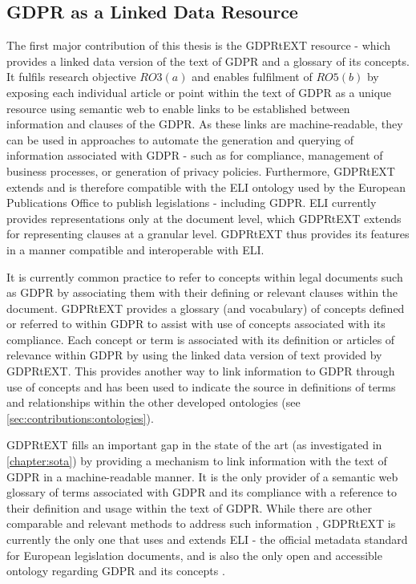 \subsection{GDPR as a Linked Data Resource}
The first major contribution of this thesis is the GDPRtEXT resource - which provides a linked data version of the text of GDPR and a glossary of its concepts. It fulfils research objective $RO3(a)$ and enables fulfilment of $RO5(b)$ by exposing each individual article or point within the text of GDPR as a unique resource using semantic web to enable links to be established between information and clauses of the GDPR. As these links are machine-readable, they can be used in approaches to automate the generation and querying of information associated with GDPR - such as for compliance, management of business processes, or generation of privacy policies. Furthermore, GDPRtEXT extends and is therefore compatible with the ELI ontology \cite{thomas_european_2019} used by the European Publications Office to publish legislations - including GDPR. ELI currently provides representations only at the document level, which  GDPRtEXT extends for representing clauses at a granular level. GDPRtEXT thus provides its features in a manner compatible and interoperable with ELI.

It is currently common practice to refer to concepts within legal documents such as GDPR by associating them with their defining or relevant clauses within the document. 
GDPRtEXT provides a glossary (and vocabulary) of concepts defined or referred to within GDPR to assist with use of concepts associated with its compliance. Each concept or term is associated with its definition or articles of relevance within GDPR by using the linked data version of text provided by GDPRtEXT. This provides another way to link information to GDPR through use of concepts and has been used to indicate the source in definitions of terms and relationships within the other developed ontologies (see \autoref{sec:contributions:ontologies}).

GDPRtEXT fills an important gap in the state of the art (as investigated in \autoref{chapter:sota}) by providing a mechanism to link information with the text of GDPR in a machine-readable manner. It is the only provider of a semantic web glossary of terms associated with GDPR and its compliance with a reference to their definition and usage within the text of GDPR.
While there are other comparable and relevant methods to address such information \cite{agarwal_legislative_2018,palmirani_pronto_compliance_2018}, GDPRtEXT is currently the only one that uses and extends ELI \cite{ELI_2012} - the official metadata standard for European legislation documents, and is also the only open and accessible ontology regarding GDPR and its concepts \cite{leone_taking_2019}.

